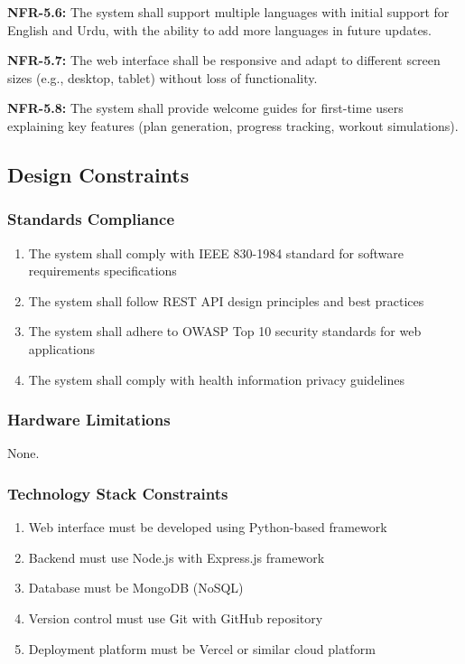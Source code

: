\documentclass[12pt,a4paper]{article}
\begin{document}
\textbf{NFR-5.6:} The system shall support multiple languages with initial support for English and Urdu, with the ability to add more languages in future updates.

\textbf{NFR-5.7:} The web interface shall be responsive and adapt to different screen sizes (e.g., desktop, tablet) without loss of functionality.

\textbf{NFR-5.8:} The system shall provide welcome guides for first-time users explaining key features (plan generation, progress tracking, workout simulations).

\subsection{Design Constraints}

\subsubsection{Standards Compliance}
\begin{enumerate}
    \item The system shall comply with IEEE 830-1984 standard for software requirements specifications
    \item The system shall follow REST API design principles and best practices
    \item The system shall adhere to OWASP Top 10 security standards for web applications
    \item The system shall comply with health information privacy guidelines
\end{enumerate}

\subsubsection{Hardware Limitations}
\begin{enumerate} 
    None.
\end{enumerate}

\subsubsection{Technology Stack Constraints}
\begin{enumerate}
    \item Web interface must be developed using Python-based framework
    \item Backend must use Node.js with Express.js framework
    \item Database must be MongoDB (NoSQL)
    \item Version control must use Git with GitHub repository
    \item Deployment platform must be Vercel or similar cloud platform
\end{enumerate}
\end{document}

